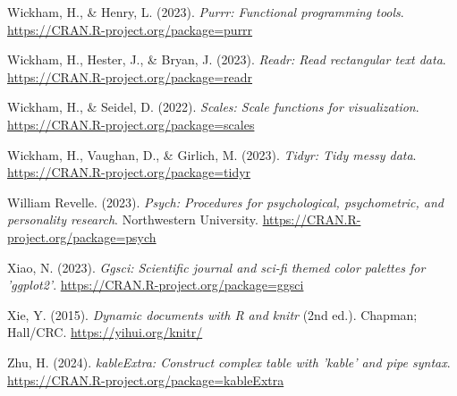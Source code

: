 \documentclass[
  man,floatsintext]{apa7}
\newlength{\cslhangindent}
\newlength{\cslentryspacingunit} %
\newenvironment{CSLReferences}[2] %
 {%
  \setlength{\parindent}{0pt}
  \ifodd #1
  \let\oldpar\par
  \def\par{\hangindent=\cslhangindent\oldpar}
  \fi
  \setlength{\parskip}{#2\cslentryspacingunit}
 }%
 {}
\begin{document}
\begin{CSLReferences}{1}{0}
\leavevmode{}%
Wickham, H., \& Henry, L. (2023). \emph{Purrr: Functional programming tools}. \url{https://CRAN.R-project.org/package=purrr}

\leavevmode{}%
Wickham, H., Hester, J., \& Bryan, J. (2023). \emph{Readr: Read rectangular text data}. \url{https://CRAN.R-project.org/package=readr}

\leavevmode{}%
Wickham, H., \& Seidel, D. (2022). \emph{Scales: Scale functions for visualization}. \url{https://CRAN.R-project.org/package=scales}

\leavevmode{}%
Wickham, H., Vaughan, D., \& Girlich, M. (2023). \emph{Tidyr: Tidy messy data}. \url{https://CRAN.R-project.org/package=tidyr}

\leavevmode{}%
William Revelle. (2023). \emph{Psych: Procedures for psychological, psychometric, and personality research}. Northwestern University. \url{https://CRAN.R-project.org/package=psych}

\leavevmode{}%
Xiao, N. (2023). \emph{Ggsci: Scientific journal and sci-fi themed color palettes for 'ggplot2'}. \url{https://CRAN.R-project.org/package=ggsci}

\leavevmode{}%
Xie, Y. (2015). \emph{Dynamic documents with {R} and knitr} (2nd ed.). Chapman; Hall/CRC. \url{https://yihui.org/knitr/}

\leavevmode{}%
Zhu, H. (2024). \emph{kableExtra: Construct complex table with 'kable' and pipe syntax}. \url{https://CRAN.R-project.org/package=kableExtra}

\end{CSLReferences}
\end{document}
